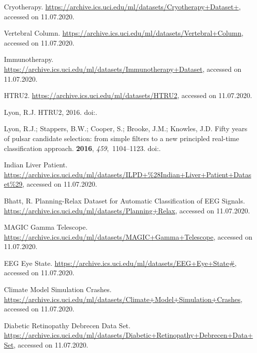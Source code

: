 \documentclass[entropy,article,submit,moreauthors,pdftex]{Definitions/mdpi}
\begin{document}
\begin{thebibliography}{-------}
Cryotherapy.
\newblock \url{https://archive.ics.uci.edu/ml/datasets/Cryotherapy+Dataset+},
  accessed on 11.07.2020.

Vertebral Column.
\newblock \url{https://archive.ics.uci.edu/ml/datasets/Vertebral+Column},
  accessed on 11.07.2020.

Immunotherapy.
\newblock \url{https://archive.ics.uci.edu/ml/datasets/Immunotherapy+Dataset},
  accessed on 11.07.2020.

{HTRU2}.
\newblock \url{https://archive.ics.uci.edu/ml/datasets/HTRU2}, accessed on
  11.07.2020.

Lyon, R.J.
\newblock HTRU2,  2016.
\newblock
  doi:{\href{https://doi.org/10.6084/M9.FIGSHARE.3080389.V1}{}}.

Lyon, R.J.; Stappers, B.W.; Cooper, S.; Brooke, J.M.; Knowles, J.D.
\newblock Fifty years of pulsar candidate selection: from simple filters to a
  new principled real-time classification approach.
 {\bf 2016}, {\em 459},~1104--1123.
\newblock
  doi:{\href{https://doi.org/10.1093/mnras/stw656}{}}.

Indian Liver Patient.
\newblock
  \url{https://archive.ics.uci.edu/ml/datasets/ILPD+%28Indian+Liver+Patient+Dataset%29},
  accessed on 11.07.2020.

Bhatt, R.
\newblock Planning-Relax Dataset for Automatic Classification of EEG Signals.
\newblock \url{https://archive.ics.uci.edu/ml/datasets/Planning+Relax},
  accessed on 11.07.2020.

MAGIC Gamma Telescope.
\newblock \url{https://archive.ics.uci.edu/ml/datasets/MAGIC+Gamma+Telescope},
  accessed on 11.07.2020.

EEG Eye State.
\newblock \url{https://archive.ics.uci.edu/ml/datasets/EEG+Eye+State\#},
  accessed on 11.07.2020.

Climate Model Simulation Crashes.
\newblock
  \url{https://archive.ics.uci.edu/ml/datasets/Climate+Model+Simulation+Crashes},
  accessed on 11.07.2020.

Diabetic Retinopathy Debrecen Data Set.
\newblock
  \url{https://archive.ics.uci.edu/ml/datasets/Diabetic+Retinopathy+Debrecen+Data+Set},
  accessed on 11.07.2020.


\end{thebibliography}
\end{document}
